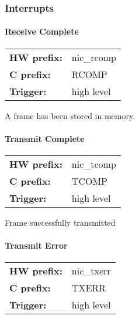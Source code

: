 \subsubsection{Interrupts}
\paragraph*{Receive Complete}\vspace{12pt}
\begin{small}
\begin{tabular}{l l }
{\bf HW prefix:}  & nic\_rcomp\\
{\bf C prefix:}  & RCOMP\\
{\bf Trigger:}  & high level\\
\end{tabular}

\end{small}
\vspace{12pt}
A frame has been stored in memory.
\paragraph*{Transmit Complete}\vspace{12pt}
\begin{small}
\begin{tabular}{l l }
{\bf HW prefix:}  & nic\_tcomp\\
{\bf C prefix:}  & TCOMP\\
{\bf Trigger:}  & high level\\
\end{tabular}

\end{small}
\vspace{12pt}
Frame successfully transmitted
\paragraph*{Transmit Error}\vspace{12pt}
\begin{small}
\begin{tabular}{l l }
{\bf HW prefix:}  & nic\_txerr\\
{\bf C prefix:}  & TXERR\\
{\bf Trigger:}  & high level\\
\end{tabular}

\end{small}

